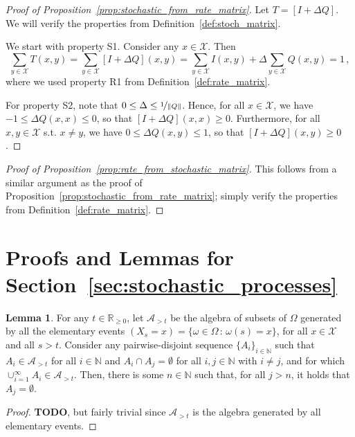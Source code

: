 \documentclass[10pt]{paper}
\theoremstyle{definition}
\newtheorem{lemma}[theorem]{Lemma}
\newcommand{\nats}{\mathbb{N}}
\newcommand{\reals}{\mathbb{R}}
\newcommand{\realsnonneg}{\reals_{\geq 0}}
\newcommand{\states}{\mathcal{X}}
\newcommand{\norm}[1]{\left\lVert #1 \right\rVert}
\begin{document}
\begin{proof}[Proof of Proposition~\ref{prop:stochastic_from_rate_matrix}]
Let $T=[I+\Delta Q]$. We will verify the properties from Definition~\ref{def:stoch_matrix}.

We start with property S1. Consider any $x\in\states$. Then
\begin{equation*}
\sum_{y\in\states} T(x,y) = \sum_{y\in\states} [I + \Delta Q](x,y) = \sum_{y\in\states}I(x,y) + \Delta \sum_{y\in\states}Q(x,y) = 1\,,
\end{equation*}
where we used property R1 from Definition~\ref{def:rate_matrix}.

For property S2, note that $0\leq \Delta \leq \nicefrac{1}{\norm{Q}}$. Hence, for all $x\in\states$, we have $-1\leq \Delta Q(x,x) \leq 0$, so that $[I+\Delta Q](x,x) \geq 0$. Furthermore, for all $x,y\in\states$ s.t. $x\neq y$, we have $0\leq \Delta Q(x,y) \leq 1$, so that $[I+\Delta Q](x,y)\geq 0$.
\end{proof}

\begin{proof}[Proof of Proposition~\ref{prop:rate_from_stochastic_matrix}]
This follows from a similar argument as the proof of Proposition~\ref{prop:stochastic_from_rate_matrix}; simply verify the properties from Definition~\ref{def:rate_matrix}.
\end{proof}

\section{Proofs and Lemmas for Section~\ref{sec:stochastic_processes}}

\begin{lemma}
For any $t\in\realsnonneg$, let $\mathcal{A}_{>t}$ be the algebra of subsets of $\Omega$ generated by all the elementary events $(X_s=x)= \{\omega\in\Omega\,:\,\omega(s)=x\}$, for all $x\in\states$ and all $s>t$. Consider any pairwise-disjoint sequence $\{A_i\}_{i\in\nats}$ such that $A_i\in\mathcal{A}_{>t}$ for all $i\in\nats$ and $A_i\cap A_j=\emptyset$ for all $i,j\in\nats$ with $i\neq j$, and for which $\cup_{i=1}^\infty A_i\in\mathcal{A}_{>t}$. Then, there is some $n\in\nats$ such that, for all $j>n$, it holds that $A_j=\emptyset$.
\end{lemma}
\begin{proof}
{\bf TODO}, but fairly trivial since $\mathcal{A}_{>t}$ is the algebra generated by all elementary events.
\end{proof}
\end{document}
